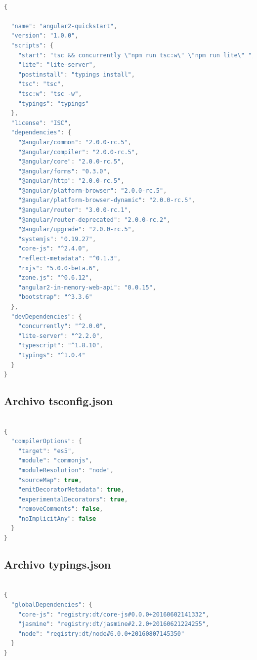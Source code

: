 \documentclass[12pt,twoside]{book}
\begin{document}
\begin{lstlisting}[language=java]

{

  "name": "angular2-quickstart",
  "version": "1.0.0",
  "scripts": {
    "start": "tsc && concurrently \"npm run tsc:w\" \"npm run lite\" ",
    "lite": "lite-server",
    "postinstall": "typings install",
    "tsc": "tsc",
    "tsc:w": "tsc -w",
    "typings": "typings"
  },
  "license": "ISC",
  "dependencies": {
    "@angular/common": "2.0.0-rc.5",
    "@angular/compiler": "2.0.0-rc.5",
    "@angular/core": "2.0.0-rc.5",
    "@angular/forms": "0.3.0",
    "@angular/http": "2.0.0-rc.5",
    "@angular/platform-browser": "2.0.0-rc.5",
    "@angular/platform-browser-dynamic": "2.0.0-rc.5",
    "@angular/router": "3.0.0-rc.1",
    "@angular/router-deprecated": "2.0.0-rc.2",
    "@angular/upgrade": "2.0.0-rc.5",
    "systemjs": "0.19.27",
    "core-js": "^2.4.0",
    "reflect-metadata": "^0.1.3",
    "rxjs": "5.0.0-beta.6",
    "zone.js": "^0.6.12",
    "angular2-in-memory-web-api": "0.0.15",
    "bootstrap": "^3.3.6"
  },
  "devDependencies": {
    "concurrently": "^2.0.0",
    "lite-server": "^2.2.0",
    "typescript": "^1.8.10",
    "typings": "^1.0.4"
  }
}
\end{lstlisting}

\subsection{Archivo tsconfig.json}


\begin{lstlisting}[language=java]

{
  "compilerOptions": {
    "target": "es5",
    "module": "commonjs",
    "moduleResolution": "node",
    "sourceMap": true,
    "emitDecoratorMetadata": true,
    "experimentalDecorators": true,
    "removeComments": false,
    "noImplicitAny": false
  }
}
\end{lstlisting}

\subsection{Archivo typings.json}

\begin{lstlisting}[language=java]

{
  "globalDependencies": {
    "core-js": "registry:dt/core-js#0.0.0+20160602141332",
    "jasmine": "registry:dt/jasmine#2.2.0+20160621224255",
    "node": "registry:dt/node#6.0.0+20160807145350"
  }
}
\end{lstlisting}
\end{document}
